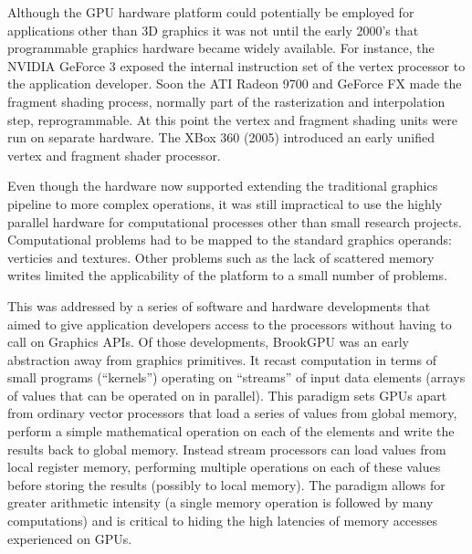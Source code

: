Although the GPU hardware platform could potentially be employed for applications other than 3D graphics it was not until the early 2000's that programmable graphics hardware became widely
available. For instance, the NVIDIA GeForce 3 exposed the internal instruction set of the vertex processor to the application developer. Soon the ATI Radeon 9700 and GeForce FX 
made the fragment shading process, normally part of the rasterization and interpolation step, reprogrammable. At this point the vertex and fragment shading units were run on separate
hardware. The XBox 360 (2005) introduced an early unified vertex and fragment shader processor.

Even though the hardware now supported extending the traditional graphics pipeline to more complex operations, it was still impractical to use the highly parallel hardware for 
computational processes other than small research projects. Computational problems had to be mapped to the standard graphics operands: verticies and textures. Other problems
such as the lack of scattered memory writes limited the applicability of the platform to a small number of problems.

This was addressed by a series of software and hardware developments that aimed to give application developers access to the processors without having to call
on Graphics APIs. Of those developments, BrookGPU \cite{buck2004brook} was an early abstraction away from graphics primitives. It recast computation in terms of small programs (``kernels'') operating
on ``streams'' of input data elements (arrays of values that can be operated on in parallel). This paradigm sets GPUs apart from ordinary vector processors that load a series of values from global
memory, perform a simple mathematical operation on each of the elements and write the results back to global memory. Instead stream processors can load values from local register memory, performing multiple
operations on each of these values before storing the results (possibly to local memory). The paradigm allows for greater arithmetic intensity (a single memory operation is followed
by many computations) and is critical to hiding the high latencies of memory accesses experienced on GPUs. 

